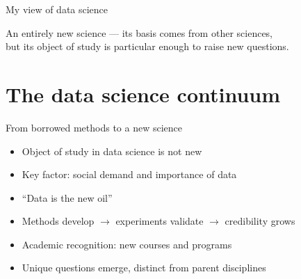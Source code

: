 
\def\verrids{(0,0) circle (20mm)}
\def\verrist{(-2.5,0) circle (15mm)}
\def\verride{(2.5,0) circle (15mm)}
\def\verrics{(0,-2.5) circle (15mm)}

\begin{frame}{My view of data science}
  \centering

  \vspace{0.3cm}
  \small An entirely new science --- its basis comes from other sciences,\\
  but its object of study is particular enough to raise new questions.
\end{frame}

\section{The data science continuum}

\begin{frame}{From borrowed methods to a new science}
  \begin{itemize}
    \item Object of study in data science is not new
    \item Key factor: social demand and importance of data
    \item ``Data is the new oil''
    \item Methods develop $\to$ experiments validate $\to$ credibility grows
    \item Academic recognition: new courses and programs
    \item Unique questions emerge, distinct from parent disciplines
  \end{itemize}
\end{frame}


